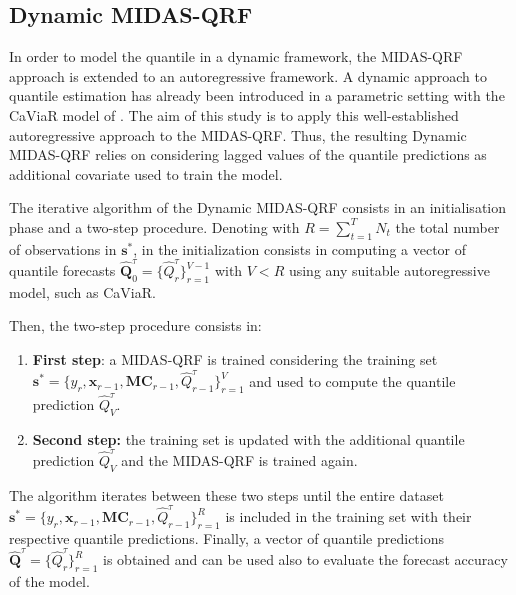 \subsection{Dynamic MIDAS-QRF}

In order to model the quantile in a dynamic framework, the MIDAS-QRF approach is extended to an autoregressive framework. A dynamic approach to quantile estimation has already been introduced in a parametric setting with the CaViaR model of \cite{engle2004caviar}. The aim of this study is to apply this well-established autoregressive approach to the MIDAS-QRF. Thus, the resulting Dynamic MIDAS-QRF relies on considering lagged values of the quantile predictions as additional covariate used to train the model.

\vspace{0.15in}

\noindent The iterative algorithm of the Dynamic MIDAS-QRF consists in an initialisation phase and a two-step procedure. Denoting with $R= \sum_{t=1}^T N_t$ the total number of observations in $\mathbf{s}^*$, in the initialization consists in computing a vector of quantile forecasts $\mathbf{\hat{Q}}^{\tau}_0=\{\hat{Q}_{r}^{\tau}\}_{r=1}^{V-1}$ with $V<R$ using any suitable autoregressive model, such as CaViaR. 

\vspace{0.15in}

\noindent Then, the two-step procedure consists in:
\begin{enumerate}

\item \textbf{First step}: a MIDAS-QRF is trained considering the training set 
\newline $\mathbf{s}^*=\{y_r, \mathbf{x}_{r-1}, \mathbf{MC}_{r-1}, \hat{Q}_{r-1}^{\tau}\}_{r=1}^{V}$ and used to compute the quantile prediction $\hat{Q}_{V}^{\tau}$.

\item \textbf{Second step:} the training set is updated with the additional quantile prediction $\hat{Q}_{V}^{\tau}$ and the MIDAS-QRF is trained again.
\end{enumerate}

\vspace{0.15in}

\noindent The algorithm iterates between these two steps until the entire dataset 
\newline $\mathbf{s}^*=\{y_r, \mathbf{x}_{r-1}, \mathbf{MC}_{r-1}, \hat{Q}_{r-1}^{\tau}\}_{r=1}^{R}$ is included in the training set with their respective quantile predictions. Finally, a vector of quantile predictions $\hat{\mathbf{Q}}^\tau=\{\hat{Q}^{\tau}_{r}\}_{r=1}^{R}$ is obtained and can be used also to evaluate the forecast accuracy of the model.


